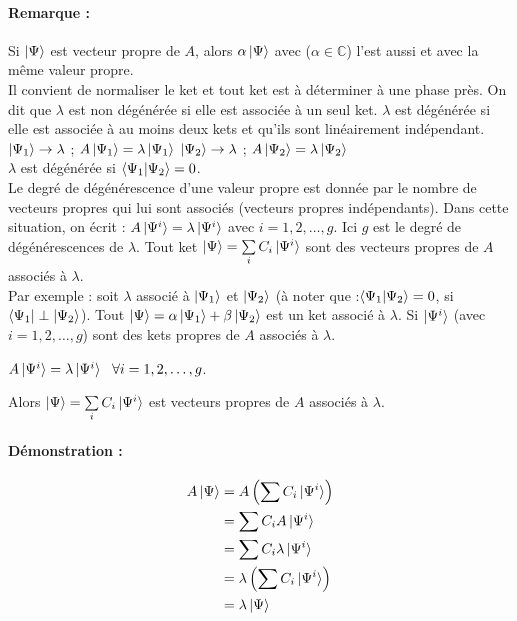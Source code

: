 \documentclass[12pt,a4paper,titlepage]{book}
\begin{document}
\paragraph*{Remarque :}
Si $\ket{\Psi}$ est vecteur propre de $A$, alors $\alpha \ket{\Psi}$ avec ($\alpha \in \mathbb{C}$) l'est aussi et avec la même valeur propre.\\

Il convient de normaliser le ket et tout ket est à déterminer à une phase près. On dit que $\lambda$ est non dégénérée si elle est associée à un seul ket. $\lambda$ est dégénérée si elle est associée à au moins deux kets et qu'ils sont linéairement indépendant.\\

$\ket{\Psi_1} \rightarrow \lambda$ ; $A \ket{\Psi_1} = \lambda \ket{\Psi_1}$
$\ket{\Psi_2} \rightarrow \lambda$ ; $A \ket{\Psi_2} = \lambda \ket{\Psi_2}$\\

$\lambda$ est dégénérée si $\braket{\Psi_1 | \Psi_2} = 0$.\\

Le degré de dégénérescence d'une valeur propre est donnée par le nombre de vecteurs propres qui lui sont associés (vecteurs propres indépendants). Dans cette situation, on écrit : $A \ket{\Psi^i} = \lambda \ket{\Psi^i}$ avec $i = 1, 2, \ldots, g$. Ici $g$ est le degré de dégénérescences de $\lambda$. Tout ket $\ket{\Psi} = \sum\limits_i C_i \ket{\Psi^i}$ sont des vecteurs propres de $A$ associés à $\lambda$.\\

Par exemple : soit $\lambda$ associé à $\ket{\Psi_1}$ et $\ket{\Psi_2}$ (à noter que :$\braket{\Psi_1 | \Psi_2} = 0$, si $\bra{\Psi_1} \perp \ket{\Psi_2}$). Tout $\ket{\Psi} = \alpha \ket{\Psi_1} + \beta \ket{\Psi_2}$ est un ket associé à $\lambda$. Si $\ket{\Psi^i}$ (avec $i = 1, 2, \ldots, g$) sont des kets propres de $A$ associés à $\lambda$.

\begin{center}
$A \ket{\Psi^i} = \lambda \ket{\Psi^i} ~~ \forall i = 1, 2, \ldots, g$. 
\end{center}

Alors $\ket{\Psi} = \sum\limits_i C_i \ket{\Psi^i}$ est vecteurs propres de $A$ associés à $\lambda$.

\paragraph*{Démonstration :}
\begin{align*}
A \ket{\Psi} &= A \left( \sum C_i \ket{\Psi^i} \right)\\
&= \sum C_i A \ket{\Psi^i}\\
&= \sum C_i \lambda \ket{\Psi^i}\\
&= \lambda \left( \sum C_i \ket{\Psi^i} \right)\\
&= \lambda \ket{\Psi}
\end{align*}
\end{document}
